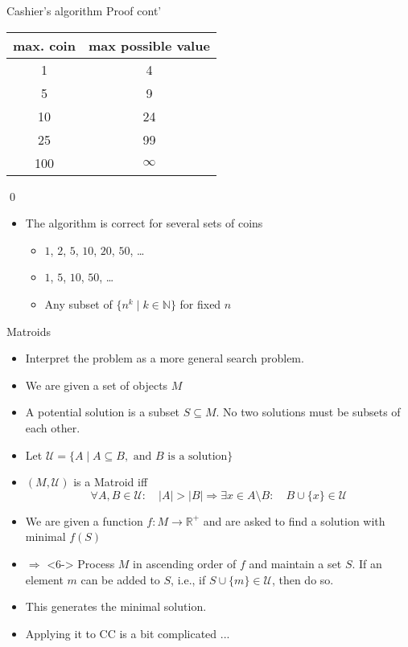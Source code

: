\documentclass[12pt,t]{beamer}
\newcommand{\bi}{\begin{itemize}}
\newcommand{\ei}{\end{itemize}}
\begin{document}
\begin{frame}[fragile]{Cashier's algorithm}
    \vspace{10pt}
    {\color{hilight}Proof cont'}\\[\baselineskip]
    \begin{tabular}{c|c}
    max. coin & max possible value \\ \hline
    1 & 4 \\
    5 & 9 \\
    10 & 24 \\
    25 & 99 \\
    100 & $\infty$
    \end{tabular}
    \flushleft \qed
      \vspace{30pt}
    \bi
        \item<2-> The algorithm is correct for several sets of coins
        	\bi
        		\item<2-> $1$, $2$, $5$, $10$, $20$, $50$, \dots
        		\item<2-> $1$, $5$, $10$, $50$, \dots
        		\item<2-> Any subset of $\{n^k \mid k \in \mathbb N\}$ for fixed $n$
        	\ei
    \ei
   
\end{frame}


\begin{frame}[fragile]{Matroids}
    \vspace{0pt}
    \bi
        \item Interpret the problem as a more general search problem.
        \item We are given a set of objects $M$ 
        \item<2-> A potential solution is a subset $S \subseteq M$. No two solutions must be subsets of each other.
        \item<3-> Let $\mathcal U = \{A \mid A \subseteq B, \text{ and } B \text{ is a solution}\}$
        \item<4-> $(M,\mathcal U)$ is a Matroid iff
        \[ \forall A,B \in \mathcal U: \quad |A| > |B| \Rightarrow \exists x \in A \setminus B: \quad B \cup \{x\} \in \mathcal U \]
        \item<5-> We are given a function $f : M \rightarrow \mathbb R ^+$ and are asked to find a solution with minimal $f(S)$
        \item[$\Rightarrow$]<6-> Process $M$ in ascending order of $f$ and maintain a set $S$.
        If an element $m$ can be added to $S$, i.e., if $S \cup \{m\} \in \mathcal U$, then do so.
        \item<7-> This generates the minimal solution.
        \item<8-> Applying it to CC is a {\color{vhilight}bit} complicated ...
    \ei
\end{frame}
\end{document}
